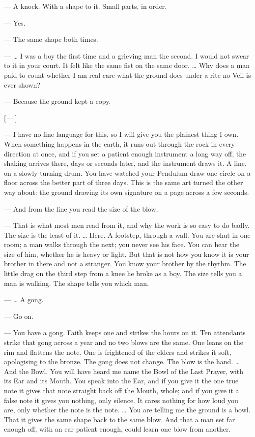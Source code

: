 \begin{room}
--- A knock. With a shape to it. Small parts, in order.

--- Yes.

--- The same shape both times.

--- \ldots{} I was a boy the first time and a grieving man the second. I would not swear to it in your court. It felt like the same fist on the same door. \ldots{} Why does a man paid to count whether I am real care what the ground does under a rite no Veil is ever shown?

--- Because the ground kept a copy.

\centerline{[\,---\,]}

--- I have no fine language for this, so I will give you the plainest thing I own. When something happens in the earth, it runs out through the rock in every direction at once, and if you set a patient enough instrument a long way off, the shaking arrives there, days or seconds later, and the instrument draws it. A line, on a slowly turning drum. You have watched your Pendulum draw one circle on a floor across the better part of three days. This is the same art turned the other way about: the ground drawing its own signature on a page across a few seconds.

--- And from the line you read the size of the blow.

--- That is what most men read from it, and why the work is so easy to do badly. The size is the least of it. \ldots{} Here. A footstep, through a wall. You are shut in one room; a man walks through the next; you never see his face. You can hear the size of him, whether he is heavy or light. But that is not how you know it is your brother in there and not a stranger. You know your brother by the rhythm. The little drag on the third step from a knee he broke as a boy. The size tells you a man is walking. The shape tells you which man.

--- \ldots{} A gong.

--- Go on.

--- You have a gong. Faith keeps one and strikes the hours on it. Ten attendants strike that gong across a year and no two blows are the same. One leans on the rim and flattens the note. One is frightened of the elders and strikes it soft, apologising to the bronze. The gong does not change. The blow is the hand. \ldots{} And the Bowl. You will have heard me name the Bowl of the Last Prayer, with its Ear and its Mouth. You speak into the Ear, and if you give it the one true note it gives that note straight back off the Mouth, whole; and if you give it a false note it gives you nothing, only silence. It cares nothing for how loud you are, only whether the note is the note. \ldots{} You are telling me the ground is a bowl. That it gives the same shape back to the same blow. And that a man set far enough off, with an ear patient enough, could learn one blow from another.


\end{room}
